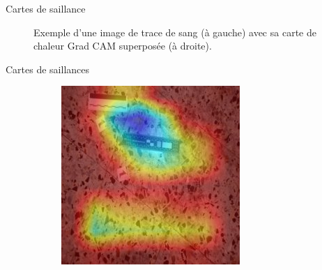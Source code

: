\documentclass[11pt]{beamer}
\begin{document}
\begin{frame}{Cartes de saillance}
\begin{figure}[ht]
\begin{subfigure}{0.40\textwidth}
        \end{subfigure}
        \caption{Exemple d'une image  de trace de sang (à gauche) avec sa carte de chaleur Grad CAM superposée (à droite).}
        \label{fig:grad_cam_example}
    \end{figure}
\end{frame}

\begin{frame}{Cartes de saillances}
    \begin{figure}[ht]
        \centering
        \begin{subfigure}{0.40\textwidth}
            \centering
            \includegraphics[width=\linewidth]{../asset/exemple/attention_reglette.jpg}
        \end{subfigure}
        \begin{subfigure}{0.40\textwidth}
            \centering

\end{subfigure}
\end{figure}
\end{frame}
\end{document}
